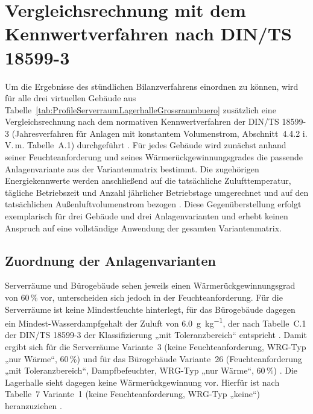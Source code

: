 \documentclass{scrreprt}
\begin{document}
\section{Vergleichsrechnung mit dem Kennwertverfahren nach DIN/TS 18599-3}\label{sec:Vergleichsrechnung}
Um die Ergebnisse des stündlichen Bilanzverfahrens einordnen zu
können, wird für alle drei virtuellen Gebäude aus
Tabelle~\ref{tab:ProfileServerraumLagerhalleGrossraumbuero} zusätzlich
eine Vergleichsrechnung nach dem normativen Kennwertverfahren der
DIN/TS 18599-3 (Jahresverfahren für Anlagen mit konstantem
Volumenstrom, Abschnitt~4.4.2 i.\,V.\,m. Tabelle~A.1) durchgeführt
\parencite{DIN185993}. Für jedes Gebäude wird zunächst anhand seiner
Feuchteanforderung und seines Wärmerückgewinnungsgrades die passende
Anlagenvariante aus der Variantenmatrix bestimmt. Die
zugehörigen Energiekennwerte werden anschließend auf die tatsächliche
Zulufttemperatur, tägliche Betriebszeit und Anzahl jährlicher
Betriebstage umgerechnet und auf den tatsächlichen
Außenluftvolumenstrom bezogen \parencite{DIN185993}. Diese
Gegenüberstellung erfolgt exemplarisch für drei Gebäude und drei
Anlagenvarianten und erhebt keinen Anspruch auf eine vollständige
Anwendung der gesamten Variantenmatrix.

\subsection{Zuordnung der Anlagenvarianten}
Serverräume und Bürogebäude sehen jeweils einen
Wärmerückgewinnungsgrad von \num{60}\,\% vor, unterscheiden sich jedoch in
der Feuchteanforderung. Für die Serverräume ist keine Mindestfeuchte
hinterlegt, für das Bürogebäude dagegen ein Mindest-Wasserdampfgehalt
der Zuluft von \SI{6.0}{\gram\per\kilo\gram}, der nach Tabelle~C.1 der
DIN/TS 18599-3 der Klassifizierung „mit Toleranzbereich“ entspricht
\parencite{DIN185993}. Damit ergibt sich für die Serverräume
Variante~3 (keine Feuchteanforderung, \ac{WRG}-Typ „nur Wärme“,
\num{60}\,\%) und für das Bürogebäude Variante~26 (Feuchteanforderung
„mit Toleranzbereich“, Dampfbefeuchter, \ac{WRG}-Typ „nur Wärme“,
\num{60}\,\%) \parencite{DIN185993}. Die Lagerhalle sieht dagegen keine
Wärmerückgewinnung vor. Hierfür ist nach Tabelle~7 Variante~1 (keine
Feuchteanforderung, \ac{WRG}-Typ „keine“) heranzuziehen
\parencite{DIN185993}.
\end{document}
